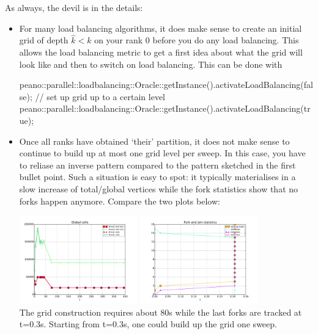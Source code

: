 As always, the devil is in the details:
\begin{itemize}
  \item  For many load balancing algorithms, it does make sense to create an
  initial grid of depth $\hat k <k$ on your rank 0 before you do any load
  balancing. This allows the load balancing metric to get a first idea about
  what the grid will look like and then to switch on load
  balancing. This can be done with
  \begin{code}
  peano::parallel::loadbalancing::Oracle::getInstance().activateLoadBalancing(false);
  // set up grid up to a certain level
  peano::parallel::loadbalancing::Oracle::getInstance().activateLoadBalancing(true);
  \end{code}
  \item Once all ranks have obtained `their' partition, it does not make sense
  to continue to build up at most one grid level per sweep. In this case, you
  have to reliase an inverse pattern compared to the pattern sketched in the
  first bullet point. Such a situation is easy to spot: it typically
  materialises in a slow increase of total/global vertices while the fork
  statistics show that no forks happen anymore. Compare the two plots below:
  \begin{center}
    \includegraphics[width=0.4\textwidth]{41_mpi-setup/grid-construction.pdf}
    \includegraphics[width=0.4\textwidth]{41_mpi-setup/fork-behaviour.pdf}
    \\
    {
    \footnotesize
    }
  The grid construction requires about 80s while the last forks are tracked
  at t=0.3s. Starting from t=0.3s, one could build up the grid one sweep.
  \end{center}

\end{itemize}
